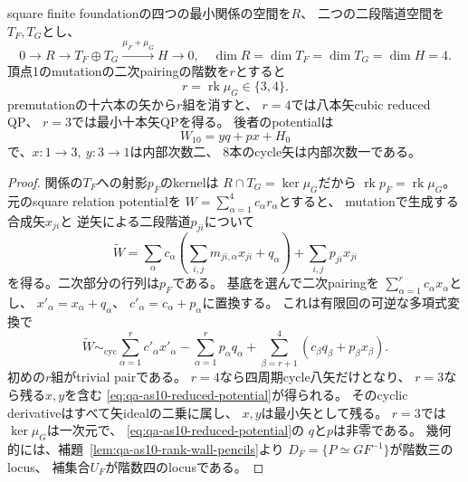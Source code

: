 \begin{proposition}
\label{prop:qa-as10-reduction}
square finite foundationの四つの最小関係の空間を$R$、
二つの二段階道空間を$T_F,T_G$とし、
\[
0\to R\to T_F\oplus T_G
 \xrightarrow{\mu_F+\mu_G} H\to0,
\quad \dim R=\dim T_F=\dim T_G=\dim H=4.
\]
頂点1のmutationの二次pairingの階数を$r$とすると
\[
 r=\operatorname{rk}\mu_G\in\{3,4\}.
\]
premutationの十六本の矢から$r$組を消すと、
$r=4$では八本矢cubic reduced QP、
$r=3$では最小十本矢QPを得る。
後者のpotentialは
\begin{equation}
 W_{10}=yq+px+H_0
 \label{eq:qa-as10-reduced-potential}
\end{equation}
で、$x:1\to3,\ y:3\to1$は内部次数二、
$8$本のcycle矢は内部次数一である。
\end{proposition}
\begin{proof}
関係の$T_F$への射影$p_F$のkernelは
$R\cap T_G=\ker\mu_G$だから
$\operatorname{rk}p_F=\operatorname{rk}\mu_G$。
元のsquare relation potentialを
$W=\sum_{\alpha=1}^4c_\alpha r_\alpha$とすると、
mutationで生成する合成矢$x_{ji}$と
逆矢による二段階道$p_{ji}$について
\[
 \widetilde W=
 \sum_\alpha c_\alpha
  \left(\sum_{i,j}m_{ji,\alpha}x_{ji}+q_\alpha\right)
 +\sum_{i,j}p_{ji}x_{ji}
\]
を得る。二次部分の行列は$p_F$である。
基底を選んで二次pairingを
$\sum_{\alpha=1}^r c_\alpha x_\alpha$とし、
$x'_\alpha=x_\alpha+q_\alpha$、
$c'_\alpha=c_\alpha+p_\alpha$に置換する。
これは有限回の可逆な多項式変換で
\[
 \widetilde W\sim_{\mathrm{cyc}}
 \sum_{\alpha=1}^r c'_\alpha x'_\alpha
 -\sum_{\alpha=1}^r p_\alpha q_\alpha
 +\sum_{\beta=r+1}^4(c_\beta q_\beta+p_\beta x_\beta).
\]
初めの$r$組がtrivial pairである。
$r=4$なら四周期cycle八矢だけとなり、
$r=3$なら残る$x,y$を含む
\eqref{eq:qa-as10-reduced-potential}が得られる。
そのcyclic derivativeはすべて矢idealの二乗に属し、
$x,y$は最小矢として残る。
$r=3$では$\ker\mu_G$は一次元で、
\eqref{eq:qa-as10-reduced-potential}の
$q$と$p$は非零である。
幾何的には、補題~\ref{lem:qa-as10-rank-wall-pencils}より
$D_F=\{P\simeq GF^{-1}\}$が階数三のlocus、
補集合$U_F$が階数四のlocusである。
\end{proof}


